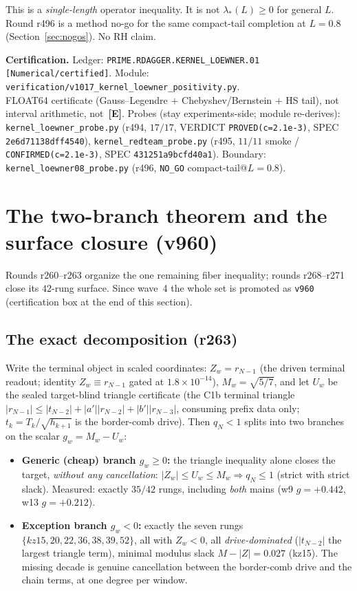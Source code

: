 \documentclass[11pt]{article}
\newcommand{\mE}{\textcolor{certgreen}{\textbf{[E]}}}
\newcommand{\certbox}[3]{%
  \par\medskip\noindent\colorbox{certgray}{\parbox{\dimexpr\linewidth-2\fboxsep}{%
    \footnotesize\raggedright\textbf{Certification.} Ledger: \texttt{#1}.\quad
    Module: \texttt{#2}.\\ #3}}\par\medskip}
\theoremstyle{definition}
\theoremstyle{remark}
\begin{document}
This is a \emph{single-length} operator inequality.  It is not
$\lambda_*(L)\ge 0$ for general $L$.  Round r496 is a method no-go for the
same compact-tail completion at $L=0.8$ (Section~\ref{sec:nogos}).
No RH claim.

\certbox{PRIME.RDAGGER.KERNEL\_LOEWNER.01 [Numerical/certified]}%
{verification/v1017\_kernel\_loewner\_positivity.py}%
{FLOAT64 certificate (Gauss--Legendre $+$ Chebyshev/Bernstein $+$ HS tail),
not interval arithmetic, not~\mE.  Probes (stay experiments-side; module re-derives):
\texttt{kernel\_loewner\_probe.py} (r494, $17/17$,
VERDICT \texttt{PROVED(c=2.1e-3)}, SPEC \texttt{2e6d71138dff4540}),
\texttt{kernel\_redteam\_probe.py} (r495, $11/11$ smoke /
\texttt{CONFIRMED(c=2.1e-3)}, SPEC \texttt{431251a9bcfd40a1}).
Boundary: \texttt{kernel\_loewner08\_probe.py} (r496,
\texttt{NO\_GO} compact-tail@$L=0.8$).}

\section{The two-branch theorem and the surface closure (v960)}\label{sec:twobranch}

Rounds r260--r263 organize the one remaining fiber inequality; rounds
r268--r271 close its $42$-rung surface.  Since wave~4 the whole set is
promoted as \texttt{v960} (certification box at the end of this section).

\subsection{The exact decomposition (r263)}
Write the terminal object in scaled coordinates: $Z_w=r_{N-1}$ (the driven
terminal readout; identity $Z_w\equiv r_{N-1}$ gated at $1.8\times10^{-14}$),
$M_w=\sqrt{5/7}$, and let $U_w$ be the sealed target-blind triangle
certificate (the C1b terminal triangle
$|r_{N-1}|\le|t_{N-2}|+|a'||r_{N-2}|+|b'||r_{N-3}|$, consuming prefix data
only; $t_k=T_k/\sqrt{h_{k+1}}$ is the border-comb drive).  Then $q_N<1$
splits into two branches on the scalar $g_w=M_w-U_w$:
\begin{itemize}[leftmargin=2em]
\item \textbf{Generic (cheap) branch $g_w\ge0$:} the triangle inequality
alone closes the target, \emph{without any cancellation}:
$|Z_w|\le U_w\le M_w\Rightarrow q_N\le1$ (strict with strict slack).
Measured: exactly $35/42$ rungs, including \emph{both} mains
(w9 $g=+0.442$, w13 $g=+0.212$).
\item \textbf{Exception branch $g_w<0$:} exactly the seven rungs
$\{kz15,20,22,36,38,39,52\}$, all with $Z_w<0$, all \emph{drive-dominated}
($|t_{N-2}|$ the largest triangle term), minimal modulus slack
$M-|Z|=0.027$ (kz15).  The missing decade is genuine cancellation between
the border-comb drive and the chain terms, at one degree per window.
\end{itemize}
\end{document}
